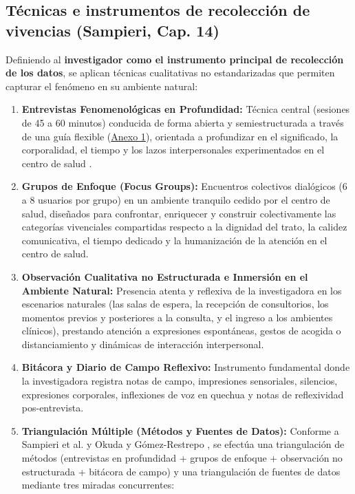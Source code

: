 \subsection{Técnicas e instrumentos de recolección de vivencias (Sampieri, Cap. 14)}
\label{sec:4.5_tecnicas}
Definiendo al \textbf{investigador como el instrumento principal de recolección de los datos}, se aplican técnicas cualitativas no estandarizadas que permiten capturar el fenómeno en su ambiente natural:

\begin{enumerate}
    \item \textbf{Entrevistas Fenomenológicas en Profundidad:} Técnica central (sesiones de 45 a 60 minutos) conducida de forma abierta y semiestructurada a través de una guía flexible (\hyperref[anx:1_guia]{Anexo 1}), orientada a profundizar en el significado, la corporalidad, el tiempo y los lazos interpersonales experimentados en el centro de salud \cite{creswell2013, norlyk2010}.
    \item \textbf{Grupos de Enfoque (Focus Groups):} Encuentros colectivos dialógicos (6 a 8 usuarios por grupo) en un ambiente tranquilo cedido por el centro de salud, diseñados para confrontar, enriquecer y construir colectivamente las categorías vivenciales compartidas respecto a la dignidad del trato, la calidez comunicativa, el tiempo dedicado y la humanización de la atención en el centro de salud.
    \item \textbf{Observación Cualitativa no Estructurada e Inmersión en el Ambiente Natural:} Presencia atenta y reflexiva de la investigadora en los escenarios naturales (las salas de espera, la recepción de consultorios, los momentos previos y posteriores a la consulta, y el ingreso a los ambientes clínicos), prestando atención a expresiones espontáneas, gestos de acogida o distanciamiento y dinámicas de interacción interpersonal.
    \item \textbf{Bitácora y Diario de Campo Reflexivo:} Instrumento fundamental donde la investigadora registra notas de campo, impresiones sensoriales, silencios, expresiones corporales, inflexiones de voz en quechua y notas de reflexividad pos-entrevista.
    \item \textbf{Triangulación Múltiple (Métodos y Fuentes de Datos):} Conforme a Sampieri et al. \cite{sampieri2018} y Okuda y Gómez-Restrepo \cite{okuda2005}, se efectúa una triangulación de métodos (entrevistas en profundidad + grupos de enfoque + observación no estructurada + bitácora de campo) y una triangulación de fuentes de datos mediante tres miradas concurrentes:

\end{enumerate}

